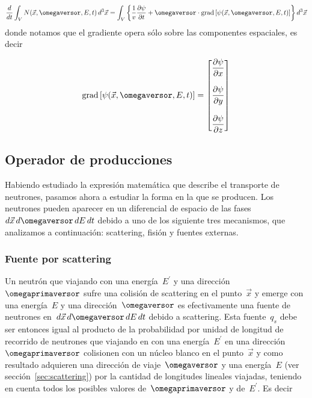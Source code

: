 \begin{equation*}
 \frac{d}{dt} \int_{V} N(\vec{x}, \omegaversor, E, t) \, d^3\vec{x}  = \int_{V} \left\{ \frac{1}{v} \frac{\partial \psi}{\partial t} + \omegaversor \cdot \text{grad} \left[ \psi(\vec{x}, \omegaversor, E, t) \right] \right\}  d^3\vec{x}
\end{equation*}
%
donde notamos que el gradiente opera sólo sobre las componentes espaciales, es decir

\begin{equation*}
 \text{grad} \left[ \psi(\vec{x}, \omegaversor, E, t) \right] =
\begin{bmatrix}
 \displaystyle \frac{\partial \psi}{\partial x} \\ \\
 \displaystyle \frac{\partial \psi}{\partial y} \\ \\
 \displaystyle \frac{\partial \psi}{\partial z} \\
\end{bmatrix}
\end{equation*}

\subsection{Operador de producciones} %

Habiendo estudiado la expresión matemática que describe el transporte de neutrones, pasamos ahora a estudiar la forma en la que se producen. Los neutrones pueden aparecer en un diferencial de espacio de las fases~$d\vec{x} \, d\omegaversor \, dE \, dt$ debido a uno de los siguiente tres mecanismos, que analizamos a continuación: scattering, fisión y fuentes externas.

\subsubsection{Fuente por scattering} %

Un neutrón que viajando con una energía~$E^\prime$ y una dirección~$\omegaprimaversor$ sufre una colisión de scattering en el punto~$\vec{x}$ y emerge con una energía~$E$ y una dirección~$\omegaversor$ es efectivamente una fuente de neutrones en~$d\vec{x} \,  d\omegaversor \, dE \, dt$ debido a scattering. Esta fuente~$q_s$ debe ser entonces igual al producto de la probabilidad por unidad de longitud de recorrido de neutrones que viajando en con una energía~$E^\prime$ en una dirección~$\omegaprimaversor$ colisionen con un núcleo blanco en el punto~$\vec{x}$ y como resultado adquieren una dirección de viaje~$\omegaversor$ y una energía~$E$ (ver sección~\ref{sec:scattering}) por la cantidad de longitudes lineales viajadas, teniendo en cuenta todos los posibles valores de~$\omegaprimaversor$ y de~$E^\prime$. Es decir

